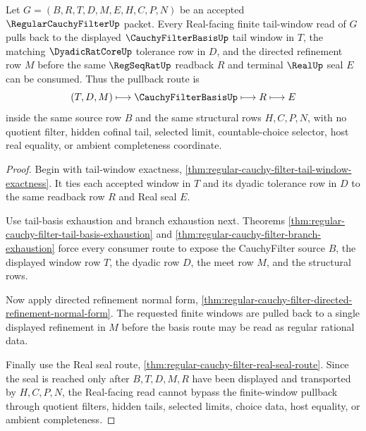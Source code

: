 \begin{theorem}
\label{thm:regular-cauchy-filter-window-pullback}
Let $G=(B,R,T,D,M,E,H,C,P,N)$ be an accepted $\RegularCauchyFilterUp$ packet. Every Real-facing finite tail-window read of $G$ pulls back to the displayed $\CauchyFilterBasisUp$ tail window in $T$, the matching $\DyadicRatCoreUp$ tolerance row in $D$, and the directed refinement row $M$ before the same $\RegSeqRatUp$ readback $R$ and terminal $\RealUp$ seal $E$ can be consumed. Thus the pullback route is
$$
(T,D,M) \longmapsto \CauchyFilterBasisUp \longmapsto R \longmapsto E
$$
inside the same source row $B$ and the same structural rows $H,C,P,N$, with no quotient filter, hidden cofinal tail, selected limit, countable-choice selector, host real equality, or ambient completeness coordinate.
\end{theorem}
\begin{proof}
Begin with tail-window exactness, \autoref{thm:regular-cauchy-filter-tail-window-exactness}. It ties each accepted window in $T$ and its dyadic tolerance row in $D$ to the same readback row $R$ and Real seal $E$.

Use tail-basis exhaustion and branch exhaustion next. Theorems \autoref{thm:regular-cauchy-filter-tail-basis-exhaustion} and \autoref{thm:regular-cauchy-filter-branch-exhaustion} force every consumer route to expose the CauchyFilter source $B$, the displayed window row $T$, the dyadic row $D$, the meet row $M$, and the structural rows.

Now apply directed refinement normal form, \autoref{thm:regular-cauchy-filter-directed-refinement-normal-form}. The requested finite windows are pulled back to a single displayed refinement in $M$ before the basis route may be read as regular rational data.

Finally use the Real seal route, \autoref{thm:regular-cauchy-filter-real-seal-route}. Since the seal is reached only after $B,T,D,M,R$ have been displayed and transported by $H,C,P,N$, the Real-facing read cannot bypass the finite-window pullback through quotient filters, hidden tails, selected limits, choice data, host equality, or ambient completeness.
\end{proof}

